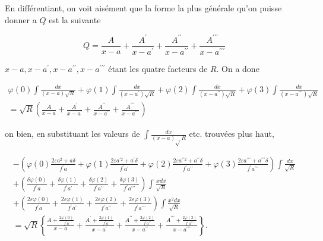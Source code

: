 \documentclass{article}
\begin{document}
En différentiant, on voit aisément que la forme la plus générale qu'on puisse donner a \(Q\) est la suivante

\[
Q=\frac{A}{x-a}+\frac{A^{\prime}}{x-a^{\prime}}+\frac{A^{\prime \prime}}{x-a^{\prime \prime}}+\frac{A^{\prime \prime \prime}}{x-a^{\prime \prime \prime}}
\]

\(x-a, x-a^{\prime}, x-a^{\prime \prime}, x-a^{\prime \prime \prime}\) étant les quatre facteurs de \(R\). On a done

\[
\begin{gathered}
\varphi(0) \int \frac{d x}{(x-a) \sqrt{R}}+\varphi(1) \int \frac{d x}{\left(x-a^{\prime}\right) \sqrt{R}}+\varphi(2) \int \frac{d x}{\left(x-a^{\prime \prime}\right) \sqrt{R}}+\varphi(3) \int \frac{d x}{\left(x-a^{\prime \prime \prime}\right) \sqrt{R}} \\
=\sqrt{R}\left(\frac{A}{x-a}+\frac{A^{\prime}}{x-a^{\prime}}+\frac{A^{\prime \prime}}{x-a^{\prime \prime}}+\frac{A^{\prime \prime \prime}}{x-a^{\prime \prime \prime}}\right)
\end{gathered}
\]

on bien, en substituant les valeurs de \(\int \frac{d x}{(x-a) \sqrt{ } R}\) etc. trouvées plus haut,

\[
\begin{gathered}
-\left(\varphi(0) \frac{2 \varepsilon a^{2}+a \delta}{f^{\prime} a}+\varphi(1) \frac{2 \varepsilon a^{\prime 2}+a^{\prime} \delta}{f^{\prime} a^{\prime}}+\varphi(2) \frac{2 \varepsilon a^{\prime \prime 2}+a^{\prime \prime} \delta}{f^{\prime} a^{\prime \prime}}+\varphi(3) \frac{2 \varepsilon a^{\prime \prime \prime}+a^{\prime \prime \prime} \delta}{f^{\prime} a^{\prime \prime \prime}}\right) \int \frac{d x}{\sqrt{R}} \\
+\left(\frac{\delta \varphi(0)}{f^{\prime} a}+\frac{\delta \varphi(1)}{f^{\prime} a^{\prime}}+\frac{\delta \varphi(2)}{f^{\prime} a^{\prime \prime}}+\frac{\delta \varphi(3)}{f^{\prime} a^{\prime \prime \prime}}\right) \int \frac{x d x}{\sqrt{R}} \\
+\left(\frac{2 \varepsilon \varphi(0)}{f^{\prime} a}+\frac{2 \varepsilon \varphi(1)}{f^{\prime} a^{\prime}}+\frac{2 \varepsilon \varphi(2)}{f^{\prime} a^{\prime \prime}}+\frac{2 \varepsilon \varphi(3)}{f^{\prime} a^{\prime \prime \prime}}\right) \int \frac{x^{2} d x}{\sqrt{R}} \\
=\sqrt{R}\left\{\frac{A+\frac{2 \varphi(0)}{f^{\prime} a}}{x-a}+\frac{A^{\prime}+\frac{2 \varphi(1)}{f^{\prime} a^{\prime}}}{x-a^{\prime}}+\frac{A^{\prime \prime}+\frac{2 \varphi(2)}{f^{\prime} a^{\prime \prime}}}{x-a^{\prime \prime}}+\frac{A^{\prime \prime \prime}+\frac{2 \varphi(3)}{f^{\prime} a^{\prime \prime \prime}}}{x-a^{\prime \prime \prime}}\right\} .
\end{gathered}
\]
\end{document}

